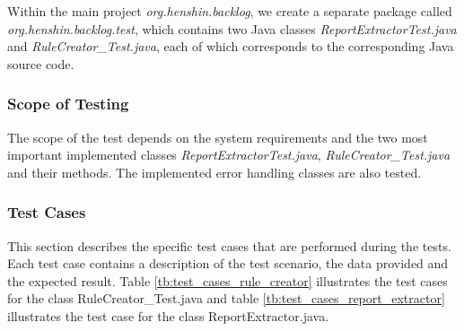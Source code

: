 Within the main project \textit{org.henshin.backlog}, we create a separate package called \textit{org.henshin.backlog.test}, which contains two Java classes \textit{ReportExtractorTest.java} and \textit{RuleCreator\_Test.java}, each of which corresponds to the corresponding Java source code.

\subsubsection*{Scope of Testing}
The scope of the test depends on the system requirements and the two most important implemented classes \textit{ReportExtractorTest.java}, \textit{RuleCreator\_Test.java} and their methods. The implemented error handling classes are also tested.

\subsubsection*{Test Cases}
This section describes the specific test cases that are performed during the tests. Each test case contains a description of the test scenario, the data provided and the expected result. Table \ref{tb:test_cases_rule_creator} illustrates the test cases for the class RuleCreator\_Test.java and table \ref{tb:test_cases_report_extractor} illustrates the test case for the class ReportExtractor.java.

